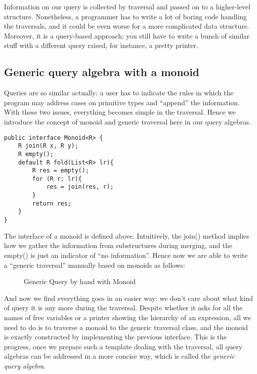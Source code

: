Information on our query is collected by traversal and passed on to a higher-level structure. Nonetheless, a programmer has to write a lot of boring code handling the traversals, and it could be even worse for a more complicated data structure. Moreover, it is a query-based approach: you still have to write a bunch of similar stuff with a different query raised, for instance, a pretty printer.\\

\subsection{Generic query algebra with a monoid}\label{subsec:genericquery}

Queries are so similar actually: a user has to indicate the rules in which the program may address cases on primitive types and ``append'' the information. With these two issues, everything becomes simple in the traversal. Hence we introduce the concept of monoid and generic traversal here in our query algebras.

\begin{lstlisting}[numbers=none]
public interface Monoid<R> {
    R join(R x, R y);
    R empty();
    default R fold(List<R> lr){
    	R res = empty();
    	for (R r: lr){
    		res = join(res, r);
    	}
    	return res;
    }
}
\end{lstlisting}

The interface of a monoid is defined above. Intuitively, the join() method implies how we gather the information from substructures during merging, and the empty() is just an indicator of ``no information''. Hence now we are able to write a ``generic traversal'' manually based on monoids as follows:

\begin{figure}[!htbp]
\vspace{-.1in}
\caption{Generic Query by hand with Monoid}
\end{figure}

And now we find everything goes in an easier way: we don't care about what kind of query it is any more during the traversal. Despite whether it asks for all the names of free variables or a printer showing the hierarchy of an expression, all we need to do is to traverse a monoid to the generic traversal class, and the monoid is exactly constructed by implementing the previous interface. This is the progress, once we prepare such a template dealing with the traversal, all query algebras can be addressed in a more concise way, which is called the \textit{generic query algebra}.

